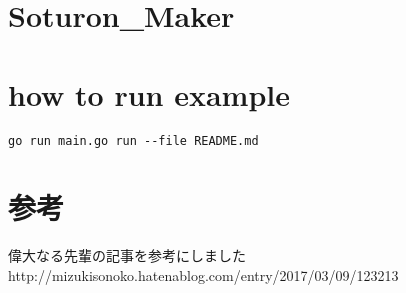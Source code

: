 \section{Soturon\_Maker}

\section{how to run example}

\begin{verbatim}
go run main.go run --file README.md
\end{verbatim}

\section{参考}

偉大なる先輩の記事を参考にしました
http://mizukisonoko.hatenablog.com/entry/2017/03/09/123213
